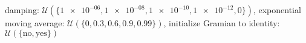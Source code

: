 damping: $\mathcal{U}(\{\num[scientific-notation=true]{1e-06},\num[scientific-notation=true]{1e-08},\num[scientific-notation=true]{1e-10},\num[scientific-notation=true]{1e-12},\num[scientific-notation=false]{0}\})$, exponential moving average: $\mathcal{U}(\{\num[scientific-notation=false]{0},\num[scientific-notation=true]{0.3},\num[scientific-notation=true]{0.6},\num[scientific-notation=true]{0.9},\num[scientific-notation=true]{0.99}\})$, initialize Gramian to identity: $\mathcal{U}(\{\text{no},\text{yes}\})$